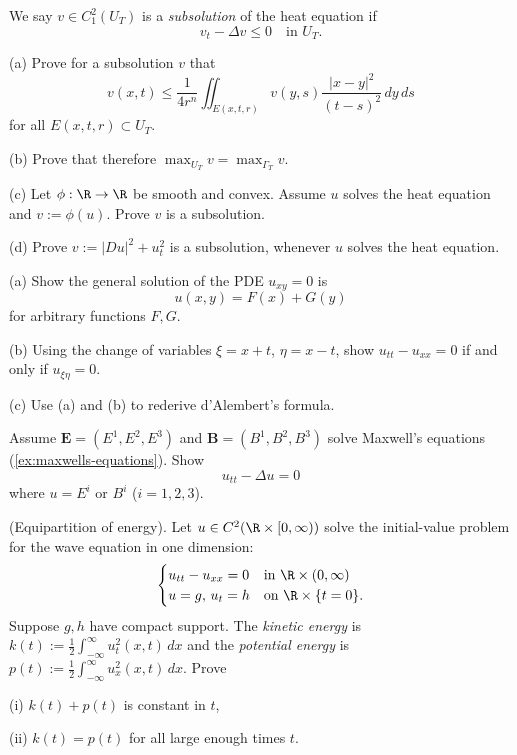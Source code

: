 \begin{exercise}
We say $v \in C_1^2(U_T)$ is a \textit{subsolution} of the heat equation if
$$v_t - \Delta v \le 0 \quad \text{in } U_T.$$

(a) Prove for a subsolution $v$ that
$$v(x,t) \le \frac{1}{4r^n} \iint_{E(x,t,r)} v(y,s) \frac{|x-y|^2}{(t-s)^2} \, dy \, ds$$
for all $E(x,t,r) \subset U_T$.

(b) Prove that therefore $\max_{U_T} v = \max_{\Gamma_T} v$.

(c) Let $\phi : \R \to \R$ be smooth and convex. Assume $u$ solves the heat equation and $v := \phi(u)$. Prove $v$ is a subsolution.

(d) Prove $v := |Du|^2 + u_t^2$ is a subsolution, whenever $u$ solves the heat equation.
\end{exercise}

\begin{exercise}
(a) Show the general solution of the PDE $u_{xy} = 0$ is
$$u(x,y) = F(x) + G(y)$$
for arbitrary functions $F, G$.

(b) Using the change of variables $\xi = x + t$, $\eta = x - t$, show $u_{tt} - u_{xx} = 0$ if and only if $u_{\xi\eta} = 0$.

(c) Use (a) and (b) to rederive d'Alembert's formula.
\end{exercise}

\begin{exercise}
Assume $\mathbf{E} = (E^1, E^2, E^3)$ and $\mathbf{B} = (B^1, B^2, B^3)$ solve Maxwell's equations (\cref{ex:maxwells-equations}). Show
$$u_{tt} - \Delta u = 0$$
where $u = E^i$ or $B^i$ ($i = 1, 2, 3$).
\end{exercise}

\begin{exercise}
(Equipartition of energy). Let $u \in C^2(\R \times [0,\infty))$ solve the initial-value problem for the wave equation in one dimension:
$$\begin{cases}
u_{tt} - u_{xx} = 0 & \text{in } \R \times (0, \infty) \\
u = g, \, u_t = h & \text{on } \R \times \{t = 0\}.
\end{cases}$$
Suppose $g, h$ have compact support. The \textit{kinetic energy} is $k(t) := \frac{1}{2}\int_{-\infty}^{\infty} u_t^2(x,t) \, dx$ and the \textit{potential energy} is $p(t) := \frac{1}{2}\int_{-\infty}^{\infty} u_x^2(x,t) \, dx$. Prove

(i) $k(t) + p(t)$ is constant in $t$,

(ii) $k(t) = p(t)$ for all large enough times $t$.
\end{exercise}

